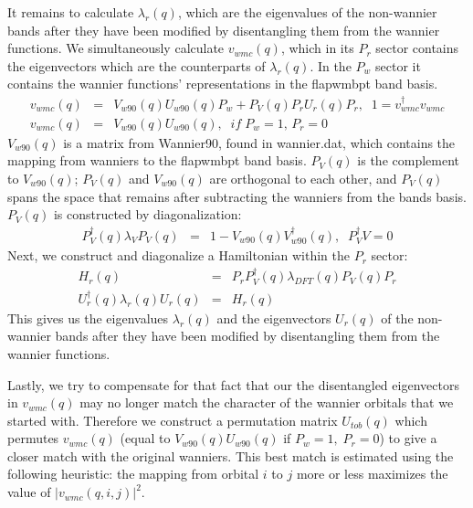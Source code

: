 \documentclass[aps,prb,singlecolumn,preprintnumbers,amsmath,amssymb]{revtex4}
\begin{document}
It remains to calculate $\lambda_{r}(q)$, which  are the eigenvalues of the non-wannier bands after they have been modified by disentangling them from the wannier functions. We simultaneously calculate  $v_{wmc}(q)$, which  in its $P_r$ sector contains the eigenvectors which are the counterparts of $\lambda_{r}(q)$. In the $P_w$ sector it contains the wannier functions' representations in the flapwmbpt band basis.
 \begin{eqnarray}
v_{wmc}(q) &=&   V_{w90}(q)  U_{w90}(q) P_w + P_V(q) P_r U_r(q) P_r, \;\;1 =v_{wmc}^\dagger v_{wmc} \nonumber \\ %
v_{wmc}(q) &=&   V_{w90}(q)  U_{w90}(q), \;\;  if \; P_w=1,\, P_r= 0 \nonumber 
 \end{eqnarray}
$ V_{w90}(q) $ is a matrix from Wannier90, found in wannier.dat, which contains the mapping from wanniers to the flapwmbpt band basis.  $P_V(q)$ is the complement to $V_{w90}(q)$; $P_V(q)$ and $V_{w90}(q)$ are orthogonal to each other, and $P_V(q)$ spans the space that remains after subtracting the wanniers from the bands basis.  $P_V(q)$ is constructed by diagonalization:
 \begin{eqnarray}
 P_V^\dagger(q) \lambda_V P_V(q) &=& 1 -  V_{w90}(q)  V_{w90}^\dagger(q), \;\; P_V^\dagger V = 0 %
 \end{eqnarray}
Next, we construct and diagonalize a Hamiltonian within the $P_r$ sector:
 \begin{eqnarray}
H_r(q) &=& P_r P_V^\dagger(q)  \lambda_{DFT}(q) P_V(q) P_r \\
U_r^\dagger(q) \lambda_{r}(q) U_r(q) &=& H_r(q) 
 \end{eqnarray}
This gives us the eigenvalues $ \lambda_{r}(q)$ and the eigenvectors $U_r(q)$ of the non-wannier bands after they have been modified by disentangling them from the wannier functions.

Lastly, we try to compensate for that fact that our the disentangled eigenvectors in $v_{wmc}(q)$ may no longer match the character of the wannier orbitals that we started with.  Therefore we construct a permutation matrix   $U_{tob}(q)$ which permutes $v_{wmc}(q)$ (equal to $V_{w90}(q)  U_{w90}(q)$ if $P_w=1,\; P_r=0$)  to give a closer match with  the original wanniers. This best match is estimated using the following heuristic: the mapping from orbital $i$ to $j$  more or less maximizes the value of $|v_{wmc}(q,i,j)|^2$.
\end{document}
